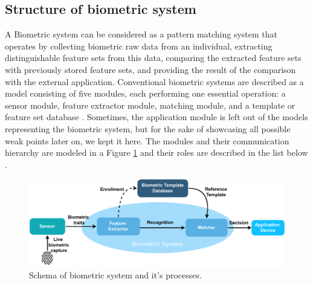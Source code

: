 \subsection{Structure of biometric system}
A Biometric system can be considered as a pattern matching system that operates by collecting biometric raw data from an individual, extracting distinguishable feature sets from this data, comparing the extracted feature sets with previously stored feature sets, and providing the result of the comparison with the external application. Conventional biometric systems are described as a model consisting of five modules, each performing one essential operation: a sensor module, feature extractor module, matching module, and a template or feature set database \cite{HandbookOfBiometrics}. Sometimes, the application module is left out of the models representing the biometric system, but for the sake of showcasing all possible weak points later on, we kept it here. The modules and their communication hierarchy are modeled in a Figure \ref{biometricSystem} and their roles are described in the list below \cite{AttacksOnBiometrics, HandbookOfBiometrics, BiometricSystemsBook}.

\begin{figure}[h]
	\centering
	\includegraphics[width=\linewidth]{obrazky-figures/BiometricSystem.pdf}
	\caption{Schema of biometric system and it's processes.}
	\label{biometricSystem}
\end{figure}

